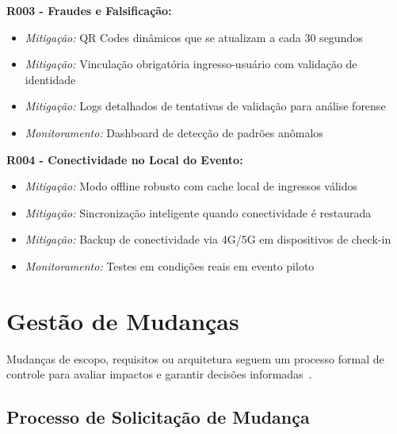 \textbf{R003 - Fraudes e Falsificação:}
\begin{itemize}
    \item \textit{Mitigação:} QR Codes dinâmicos que se atualizam a cada 30 segundos
    \item \textit{Mitigação:} Vinculação obrigatória ingresso-usuário com validação de identidade
    \item \textit{Mitigação:} Logs detalhados de tentativas de validação para análise forense
    \item \textit{Monitoramento:} Dashboard de detecção de padrões anômalos
\end{itemize}

\textbf{R004 - Conectividade no Local do Evento:}
\begin{itemize}
    \item \textit{Mitigação:} Modo offline robusto com cache local de ingressos válidos
    \item \textit{Mitigação:} Sincronização inteligente quando conectividade é restaurada
    \item \textit{Mitigação:} Backup de conectividade via 4G/5G em dispositivos de check-in
    \item \textit{Monitoramento:} Testes em condições reais em evento piloto
\end{itemize}

\section{Gestão de Mudanças}

Mudanças de escopo, requisitos ou arquitetura seguem um processo formal de controle para avaliar impactos e garantir decisões informadas~\cite{PMI:2021}.

\subsection{Processo de Solicitação de Mudança}

